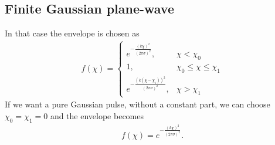 \subsection{Finite Gaussian plane-wave}
In that case the envelope is chosen as
\begin{align}
    f(\chi) = \left\{\begin{array}{ll}
                         e^{-\frac{(k\chi)^2}{(2\pi \sigma)^2}},            & \chi < \chi_0                \\
                         1,                                                 & \chi_0 \leq \chi \leq \chi_1 \\
                         e^{-\frac{(k(\chi - \chi_1))^2}{(2\pi \sigma)^2}}, & \chi > \chi_1
                     \end{array}\right.
\end{align}
If we want a pure Gaussian pulse, without a constant part, we can choose $\chi_0 = \chi_1 = 0$ and the envelope becomes
\begin{align}
    f(\chi) = e^{-\frac{(k\chi)^2}{(2\pi \sigma)^2}}.
\end{align}



